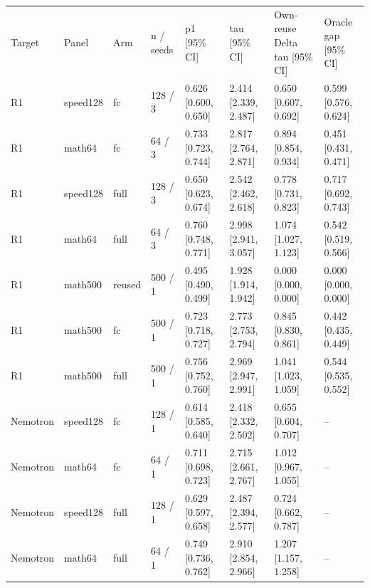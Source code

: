 \begin{tabular}{llllllll}
Target & Panel & Arm & n / seeds & p1 [95\% CI] & tau [95\% CI] & Own-reuse Delta tau [95\% CI] & Oracle gap [95\% CI] \\
R1 & speed128 & fc & 128 / 3 & 0.626 [0.600, 0.650] & 2.414 [2.339, 2.487] & 0.650 [0.607, 0.692] & 0.599 [0.576, 0.624] \\
R1 & math64 & fc & 64 / 3 & 0.733 [0.723, 0.744] & 2.817 [2.764, 2.871] & 0.894 [0.854, 0.934] & 0.451 [0.431, 0.471] \\
R1 & speed128 & full & 128 / 3 & 0.650 [0.623, 0.674] & 2.542 [2.462, 2.618] & 0.778 [0.731, 0.823] & 0.717 [0.692, 0.743] \\
R1 & math64 & full & 64 / 3 & 0.760 [0.748, 0.771] & 2.998 [2.941, 3.057] & 1.074 [1.027, 1.123] & 0.542 [0.519, 0.566] \\
R1 & math500 & reused & 500 / 1 & 0.495 [0.490, 0.499] & 1.928 [1.914, 1.942] & 0.000 [0.000, 0.000] & 0.000 [0.000, 0.000] \\
R1 & math500 & fc & 500 / 1 & 0.723 [0.718, 0.727] & 2.773 [2.753, 2.794] & 0.845 [0.830, 0.861] & 0.442 [0.435, 0.449] \\
R1 & math500 & full & 500 / 1 & 0.756 [0.752, 0.760] & 2.969 [2.947, 2.991] & 1.041 [1.023, 1.059] & 0.544 [0.535, 0.552] \\
Nemotron & speed128 & fc & 128 / 1 & 0.614 [0.585, 0.640] & 2.418 [2.332, 2.502] & 0.655 [0.604, 0.707] & -- \\
Nemotron & math64 & fc & 64 / 1 & 0.711 [0.698, 0.723] & 2.715 [2.661, 2.767] & 1.012 [0.967, 1.055] & -- \\
Nemotron & speed128 & full & 128 / 1 & 0.629 [0.597, 0.658] & 2.487 [2.394, 2.577] & 0.724 [0.662, 0.787] & -- \\
Nemotron & math64 & full & 64 / 1 & 0.749 [0.736, 0.762] & 2.910 [2.854, 2.966] & 1.207 [1.157, 1.258] & -- \\
\end{tabular}
